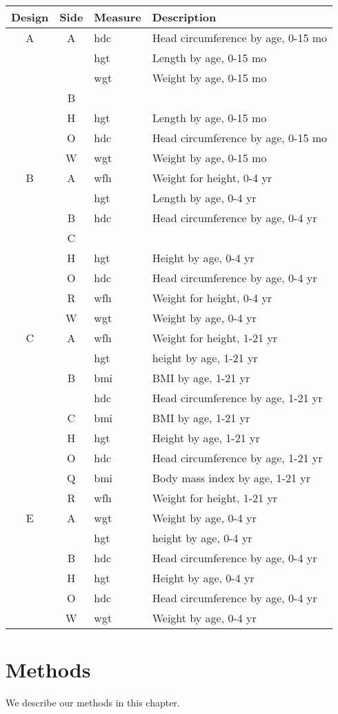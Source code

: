 \documentclass[]{book}
\begin{document}
\begin{longtable}[]{@{}ccll@{}}
\toprule
Design & Side & Measure & Description\tabularnewline
\midrule
\endhead
A & A & hdc & Head circumference by age, 0-15 mo\tabularnewline
& & hgt & Length by age, 0-15 mo\tabularnewline
& & wgt & Weight by age, 0-15 mo\tabularnewline
& B & &\tabularnewline
& H & hgt & Length by age, 0-15 mo\tabularnewline
& O & hdc & Head circumference by age, 0-15 mo\tabularnewline
& W & wgt & Weight by age, 0-15 mo\tabularnewline
B & A & wfh & Weight for height, 0-4 yr\tabularnewline
& & hgt & Length by age, 0-4 yr\tabularnewline
& B & hdc & Head circumference by age, 0-4 yr\tabularnewline
& C & &\tabularnewline
& H & hgt & Height by age, 0-4 yr\tabularnewline
& O & hdc & Head circumference by age, 0-4 yr\tabularnewline
& R & wfh & Weight for height, 0-4 yr\tabularnewline
& W & wgt & Weight by age, 0-4 yr\tabularnewline
C & A & wfh & Weight for height, 1-21 yr\tabularnewline
& & hgt & height by age, 1-21 yr\tabularnewline
& B & bmi & BMI by age, 1-21 yr\tabularnewline
& & hdc & Head circumference by age, 1-21 yr\tabularnewline
& C & bmi & BMI by age, 1-21 yr\tabularnewline
& H & hgt & Height by age, 1-21 yr\tabularnewline
& O & hdc & Head circumference by age, 1-21 yr\tabularnewline
& Q & bmi & Body mass index by age, 1-21 yr\tabularnewline
& R & wfh & Weight for height, 1-21 yr\tabularnewline
E & A & wgt & Weight by age, 0-4 yr\tabularnewline
& & hgt & height by age, 0-4 yr\tabularnewline
& B & hdc & Head circumference by age, 0-4 yr\tabularnewline
& H & hgt & Height by age, 0-4 yr\tabularnewline
& O & hdc & Head circumference by age, 0-4 yr\tabularnewline
& W & wgt & Weight by age, 0-4 yr\tabularnewline
\bottomrule
\end{longtable}

\hypertarget{methods}{%
\chapter{Methods}\label{methods}}

We describe our methods in this chapter.


\end{document}
